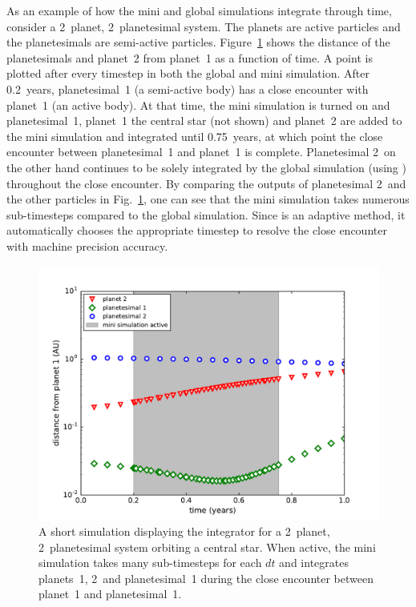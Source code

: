 As an example of how the mini and global simulations integrate through time, consider a 2~planet, 2~planetesimal system. 
The planets are active particles and the planetesimals are semi-active particles.
Figure~\ref{fig:CE_fig} shows the distance of the planetesimals and planet~2 from planet~1 as a function of time. 
A point is plotted after every timestep in both the global and mini simulation. 
After 0.2~years, planetesimal~1 (a semi-active body) has a close encounter with planet~1 (an active body). 
At that time, the mini simulation is turned on and planetesimal~1, planet~1 the central star (not shown) and planet~2 are added to the mini simulation and integrated until 0.75~years, at which point the close encounter between planetesimal~1 and planet~1 is complete.
Planetesimal 2~on the other hand continues to be solely integrated by the global simulation (using \whfast) throughout the close encounter.
By comparing the outputs of planetesimal 2~and the other particles in Fig.~\ref{fig:CE_fig}, one can see that the mini simulation takes numerous sub-timesteps compared to the global simulation.
Since \ias is an adaptive method, it automatically chooses the appropriate timestep to resolve the close encounter with machine precision accuracy.

\begin{figure}
\centerline{\includegraphics[scale=0.45]{chap4/images/CE_fig.pdf}}
\caption{
    A short simulation displaying the \hermes integrator for a 2~planet, 2~planetesimal system orbiting a central star. 
When active, the mini simulation takes many sub-timesteps for each $dt$ and integrates planets~1, 2~and planetesimal~1 during the close encounter between planet~1 and planetesimal~1. 
 }
\label{fig:CE_fig}
\end{figure}

